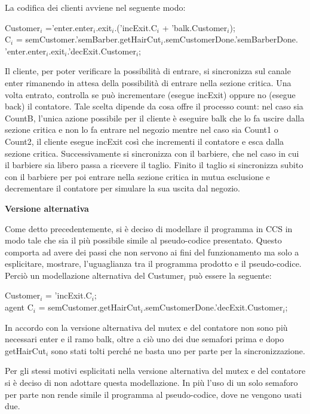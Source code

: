 La codifica dei clienti avviene nel seguente modo:

\textsf{Customer$_{i}$ ='enter.enter$_{i}$.exit$_{i}$.('incExit.C$_{i}$ + 'balk.Customer$_{i}$);}\\
\textsf{C$_{i}$ = semCustomer.'semBarber.getHairCut$_{i}$.semCustomerDone.'semBarberDone.}\\
\textsf{'enter.enter$_{i}$.exit$_{i}$.'decExit.Customer$_{i}$;}

Il cliente, per poter verificare la possibilità di entrare, si sincronizza sul canale \textsf{enter} rimanendo in attesa della possibilità di entrare nella sezione critica. Una volta entrato, controlla se può incrementare (esegue \textsf{incExit}) oppure no (esegue \textsf{back}) il contatore. Tale scelta dipende da cosa offre il processo \textsf{count}: nel caso sia \textsf{CountB}, l'unica azione possibile per il cliente è eseguire \textsf{balk} che lo fa uscire dalla sezione critica e non lo fa entrare nel negozio mentre nel caso sia \textsf{Count1} o \textsf{Count2}, il cliente esegue \textsf{incExit} così che incrementi il contatore e esca dalla sezione critica. Successivamente si sincronizza con il barbiere, che nel caso in cui il barbiere sia libero passa a ricevere il taglio. Finito il taglio si sincronizza subito con il barbiere per poi entrare nella sezione critica in mutua esclusione e decrementare il contatore per simulare la sua uscita dal negozio.

\textbf{Versione alternativa}

Come detto precedentemente, si è deciso di modellare il programma in CCS in modo tale che sia il più possibile simile al pseudo-codice presentato. Questo comporta ad avere dei passi che non servono ai fini del funzionamento ma solo a esplicitare, mostrare, l'uguaglianza tra il programma prodotto e il pseudo-codice.
Perciò un modellazione alternativa del \textsf{Custumer$_{i}$} può essere la seguente:

\textsf{Customer$_{i}$ = 'incExit.C$_{i}$;}\\
\textsf{agent C$_{i}$ = semCustomer.getHairCut$_{i}$.semCustomerDone.'decExit.Customer$_{i}$;}

In accordo con la versione alternativa del \textsf{mutex} e del contatore non sono più necessari \textsf{enter} e il ramo \textsf{balk}, oltre a ciò uno dei due semafori prima e dopo getHairCut$_{i}$ sono stati tolti perché ne basta uno per parte per la sincronizzazione.

Per gli stessi motivi esplicitati nella versione alternativa del \textsf{mutex} e del contatore si è deciso di non adottare questa modellazione. In più l'uso di un solo semaforo per parte non rende simile il programma al pseudo-codice, dove ne vengono usati due.

